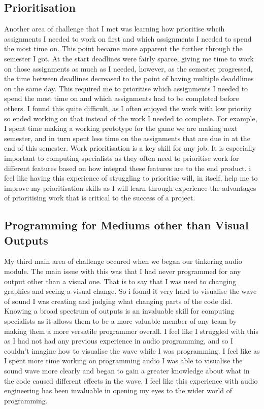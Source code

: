 \documentclass{scrartcl}
\begin{document}
\subsection{Prioritisation}
Another area of challenge that I met was learning how prioritise whcih assignments I needed to work on first and which assignments I needed to spend the most time on. This point became more apparent the further through the semester I got. At the start deadlines were fairly sparce, giving me time to work on those assignments as much as I needed, however, as the semester progressed, the time between deadlines decreased to the point of having multiple deaddlines on the same day. This required me to prioritise which assignments I needed to spend the most time on and which assignments had to be completed before others. I found this quite difficult, as I often enjoyed the work with low priority so ended working on that instead of the work I needed to complete. For example, I spent time making a working prototype for the game we are making next semester, and in turn spent less time on the assignments that are due in at the end of this semester. Work prioritisation is a key skill for any job. It is especially important to computing specialists as they often need to prioritise work for different features based on how integral these features are to the end product. i feel like having this experience of struggling to prioritise will, in itself, help me to improve my prioritisation skills as I will learn through experience the advantages of prioritising work that is critical to the success of a project.

\subsection{Programming for Mediums other than Visual Outputs}
My third main area of challenge occured when we began our tinkering audio module. The main issue with this was that I had never programmed for any output other than a visual one. That is to say that I was used to changing graphics and seeing a visual change. So i found it very hard to visualise the wave of sound I was creating and judging what changing parts of the code did. Knowing a broad spectrum of outputs is an invaluable skill for computing specialists as it allows them to be a more valuable member of any team by making them a more versatile programmer overall. I feel like I struggled with this as I had not had any previous experience in audio programming, and so I couldn't imagine how to visualise the wave while I was programming. I feel like as I spent more time working on programming audio I was able to visualise the sound wave more clearly and began to gain a greater knowledge about what in the code caused different effects in the wave. I feel like this experience with audio engineering has been invaluable in opening my eyes to the wider world of programming.
\end{document}
